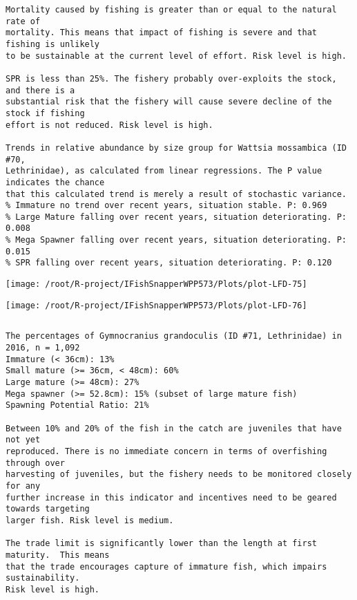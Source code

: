 \documentclass{report}\usepackage[]{graphicx}\usepackage[]{color}
\makeatletter
\def\maxwidth{ %
  \ifdim\Gin@nat@width>\linewidth
    \linewidth
  \else
    \Gin@nat@width
  \fi
}
\newenvironment{kframe}{%
 \def\at@end@of@kframe{}%
 \ifinner\ifhmode%
  \def\at@end@of@kframe{\end{minipage}}%
  \begin{minipage}{\columnwidth}%
 \fi\fi%
 \def\FrameCommand##1{\hskip\@totalleftmargin \hskip-\fboxsep
 \colorbox{shadecolor}{##1}\hskip-\fboxsep
     \hskip-\linewidth \hskip-\@totalleftmargin \hskip\columnwidth}%
 \MakeFramed {\advance\hsize-\width
   \@totalleftmargin\z@ \linewidth\hsize
   \@setminipage}}%
 {\par\unskip\endMakeFramed%
 \at@end@of@kframe}
\newenvironment{knitrout}{}{} %
\makeatother
\begin{document}
\begin{knitrout}
\begin{kframe}
\begin{verbatim}
Mortality caused by fishing is greater than or equal to the natural rate of
mortality. This means that impact of fishing is severe and that fishing is unlikely
to be sustainable at the current level of effort. Risk level is high.
 
SPR is less than 25%. The fishery probably over-exploits the stock, and there is a
substantial risk that the fishery will cause severe decline of the stock if fishing
effort is not reduced. Risk level is high.
 
Trends in relative abundance by size group for Wattsia mossambica (ID #70,
Lethrinidae), as calculated from linear regressions. The P value indicates the chance
that this calculated trend is merely a result of stochastic variance.
% Immature no trend over recent years, situation stable. P: 0.969
% Large Mature falling over recent years, situation deteriorating. P: 0.008
% Mega Spawner falling over recent years, situation deteriorating. P: 0.015
% SPR falling over recent years, situation deteriorating. P: 0.120
\end{verbatim}
\end{kframe}
\texttt{[image: /root/R-project/IFishSnapperWPP573/Plots/plot-LFD-75]} 

\texttt{[image: /root/R-project/IFishSnapperWPP573/Plots/plot-LFD-76]} 
\begin{kframe}\begin{verbatim}
\end{verbatim}
\end{kframe}
\clearpage
\newpage
\begin{kframe}\begin{verbatim}The percentages of Gymnocranius grandoculis (ID #71, Lethrinidae) in 2016, n = 1,092
Immature (< 36cm): 13%
Small mature (>= 36cm, < 48cm): 60%
Large mature (>= 48cm): 27%
Mega spawner (>= 52.8cm): 15% (subset of large mature fish)
Spawning Potential Ratio: 21%
 
Between 10% and 20% of the fish in the catch are juveniles that have not yet
reproduced. There is no immediate concern in terms of overfishing through over
harvesting of juveniles, but the fishery needs to be monitored closely for any
further increase in this indicator and incentives need to be geared towards targeting
larger fish. Risk level is medium.

The trade limit is significantly lower than the length at first maturity.  This means
that the trade encourages capture of immature fish, which impairs sustainability.
Risk level is high.


\end{verbatim}
\end{kframe}
\end{knitrout}
\end{document}
